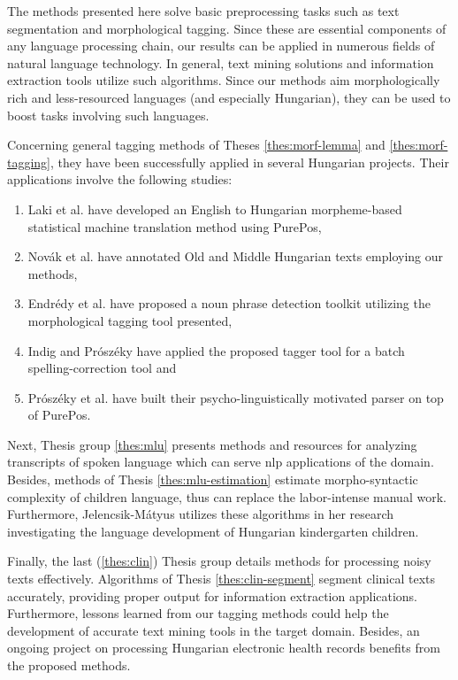 
The methods presented here solve basic preprocessing tasks such as text segmentation and morphological tagging. 
Since these are essential components of any language processing chain, our results can be applied in numerous fields of natural language technology. 
In general, text mining solutions and information extraction tools utilize such algorithms.
Since our methods aim morphologically rich and less-resourced languages (and especially Hungarian), they can be used to boost tasks involving such languages.

Concerning general tagging methods of Theses \ref{thes:morf-lemma} and \ref{thes:morf-tagging}, they have been successfully applied in several Hungarian projects.
Their applications involve the following studies:
\begin{enumerate}
\item Laki et al. \cite{Laki2013} have developed an English to Hungarian morpheme-based statistical machine translation method using PurePos,
\item Novák et al. \cite{Novak2013} have annotated Old and Middle Hungarian texts employing our methods,
\item Endrédy et al. \cite{Endredy2014} have proposed a noun phrase detection toolkit utilizing the morphological tagging tool presented,
\item Indig and Prószéky have applied \cite{Indig2013} the proposed tagger tool for a batch spelling-correction tool and
\item Prószéky et al. \cite{Proszeky2014} have built their psycho-linguistically motivated parser on top of PurePos.
\end{enumerate}

Next, Thesis group \ref{thes:mlu} presents methods and resources for analyzing transcripts of spoken language which can serve \acrshort{nlp} applications of the domain.
Besides, methods of Thesis \ref{thes:mlu-estimation} estimate morpho-syntactic complexity of children language, thus can replace the labor-intense manual work.
Furthermore, Jelencsik-Mátyus utilizes \cite{Matyus2014b} these algorithms in her research investigating the language development of Hungarian kindergarten children.

Finally, the last (\ref{thes:clin}) Thesis group details methods for processing noisy texts effectively.
Algorithms of Thesis \ref{thes:clin-segment} segment clinical texts accurately, providing proper output for information extraction applications. 
Furthermore, lessons learned from our tagging methods could help the development of accurate text mining tools in the target domain.
Besides, an ongoing project \cite{Siklosi2014,Siklosi2014mszny,Orosz2014x} on processing Hungarian electronic health records benefits from the proposed methods.


